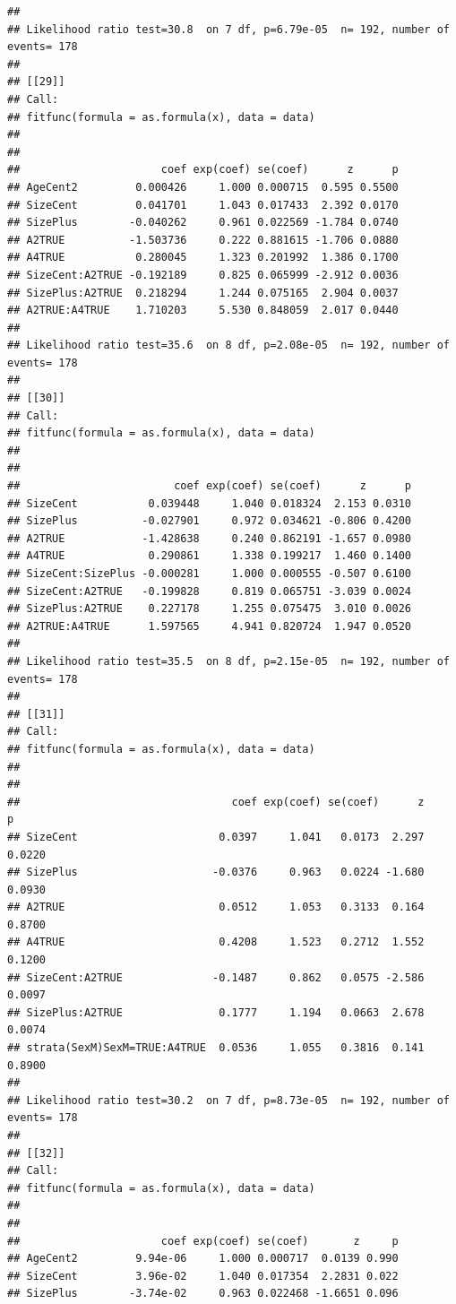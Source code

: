 \documentclass{article}\usepackage[]{graphicx}\usepackage[]{color}
\makeatletter
\newenvironment{kframe}{%
 \def\at@end@of@kframe{}%
 \ifinner\ifhmode%
  \def\at@end@of@kframe{\end{minipage}}%
  \begin{minipage}{\columnwidth}%
 \fi\fi%
 \def\FrameCommand##1{\hskip\@totalleftmargin \hskip-\fboxsep
 \colorbox{shadecolor}{##1}\hskip-\fboxsep
     \hskip-\linewidth \hskip-\@totalleftmargin \hskip\columnwidth}%
 \MakeFramed {\advance\hsize-\width
   \@totalleftmargin\z@ \linewidth\hsize
   \@setminipage}}%
 {\par\unskip\endMakeFramed%
 \at@end@of@kframe}
\newenvironment{knitrout}{}{} %
\makeatother
\begin{document}
\begin{knitrout}
\begin{kframe}
\begin{verbatim}
## 
## Likelihood ratio test=30.8  on 7 df, p=6.79e-05  n= 192, number of events= 178 
## 
## [[29]]
## Call:
## fitfunc(formula = as.formula(x), data = data)
## 
## 
##                      coef exp(coef) se(coef)      z      p
## AgeCent2         0.000426     1.000 0.000715  0.595 0.5500
## SizeCent         0.041701     1.043 0.017433  2.392 0.0170
## SizePlus        -0.040262     0.961 0.022569 -1.784 0.0740
## A2TRUE          -1.503736     0.222 0.881615 -1.706 0.0880
## A4TRUE           0.280045     1.323 0.201992  1.386 0.1700
## SizeCent:A2TRUE -0.192189     0.825 0.065999 -2.912 0.0036
## SizePlus:A2TRUE  0.218294     1.244 0.075165  2.904 0.0037
## A2TRUE:A4TRUE    1.710203     5.530 0.848059  2.017 0.0440
## 
## Likelihood ratio test=35.6  on 8 df, p=2.08e-05  n= 192, number of events= 178 
## 
## [[30]]
## Call:
## fitfunc(formula = as.formula(x), data = data)
## 
## 
##                        coef exp(coef) se(coef)      z      p
## SizeCent           0.039448     1.040 0.018324  2.153 0.0310
## SizePlus          -0.027901     0.972 0.034621 -0.806 0.4200
## A2TRUE            -1.428638     0.240 0.862191 -1.657 0.0980
## A4TRUE             0.290861     1.338 0.199217  1.460 0.1400
## SizeCent:SizePlus -0.000281     1.000 0.000555 -0.507 0.6100
## SizeCent:A2TRUE   -0.199828     0.819 0.065751 -3.039 0.0024
## SizePlus:A2TRUE    0.227178     1.255 0.075475  3.010 0.0026
## A2TRUE:A4TRUE      1.597565     4.941 0.820724  1.947 0.0520
## 
## Likelihood ratio test=35.5  on 8 df, p=2.15e-05  n= 192, number of events= 178 
## 
## [[31]]
## Call:
## fitfunc(formula = as.formula(x), data = data)
## 
## 
##                                 coef exp(coef) se(coef)      z      p
## SizeCent                      0.0397     1.041   0.0173  2.297 0.0220
## SizePlus                     -0.0376     0.963   0.0224 -1.680 0.0930
## A2TRUE                        0.0512     1.053   0.3133  0.164 0.8700
## A4TRUE                        0.4208     1.523   0.2712  1.552 0.1200
## SizeCent:A2TRUE              -0.1487     0.862   0.0575 -2.586 0.0097
## SizePlus:A2TRUE               0.1777     1.194   0.0663  2.678 0.0074
## strata(SexM)SexM=TRUE:A4TRUE  0.0536     1.055   0.3816  0.141 0.8900
## 
## Likelihood ratio test=30.2  on 7 df, p=8.73e-05  n= 192, number of events= 178 
## 
## [[32]]
## Call:
## fitfunc(formula = as.formula(x), data = data)
## 
## 
##                      coef exp(coef) se(coef)       z     p
## AgeCent2         9.94e-06     1.000 0.000717  0.0139 0.990
## SizeCent         3.96e-02     1.040 0.017354  2.2831 0.022
## SizePlus        -3.74e-02     0.963 0.022468 -1.6651 0.096

\end{verbatim}
\end{kframe}
\end{knitrout}
\end{document}

